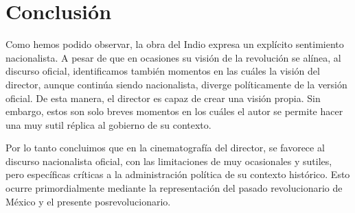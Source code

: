\section{Conclusión}
Como hemos podido observar, la obra del Indio expresa un explícito sentimiento nacionalista. A pesar de que en ocasiones su visión de la revolución se alínea, al discurso oficial, identificamos también momentos en las cuáles la visión del director, aunque continúa siendo nacionalista, diverge políticamente de la versión oficial. De esta manera, el director es capaz de crear una visión propia. Sin embargo, estos son solo breves momentos en los cuáles el autor se permite hacer una muy sutil réplica al gobierno de su contexto.

Por lo tanto concluimos que en la cinematografía del director, se favorece al discurso nacionalista oficial, con las limitaciones de  muy ocasionales y sutiles, pero específicas  críticas a la administración política de su contexto histórico. Esto ocurre primordialmente mediante la representación del pasado revolucionario de México y el presente posrevolucionario.


